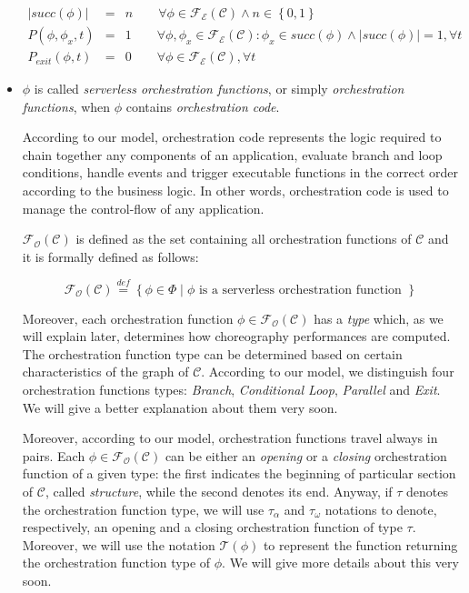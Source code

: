 \documentclass[12pt,a4paper]{report}
\newcommand{\mathDef}{\overset{\textit{def}}{=}}
\begin{document}
\begin{itemize}
	\begin{eqnarray}
		|succ(\phi)| & = & n \qquad \forall \phi \in \mathscr{F_E}(\mathcal{C}) \label{eq:executableFP1} \wedge n \in \left\{0,1\right\} \\
		P(\phi, \phi_x,t) & = & 1 \qquad \forall \phi, \phi_x \in \mathscr{F_E}(\mathcal{C}) : \phi_x \in succ(\phi) \wedge |succ(\phi)| = 1, \forall t \qquad \qquad \label{eq:executableFP2} \\
		P_{exit}(\phi, t) & = & 0 \qquad \forall \phi \in \mathscr{F_E}(\mathcal{C}), \forall t
	\end{eqnarray}


	\item $\phi$ is called \textit{serverless orchestration functions}, or simply \textit{orchestration functions}, when $\phi$ contains \textit{orchestration code}. 
	
	According to our model, orchestration code represents the logic required to chain together any components of an application, evaluate branch and loop conditions, handle events and trigger executable functions in the correct order according to the business logic. In other words, orchestration code is used to manage the control-flow of any application.
	
	$\mathscr{F_O}(\mathcal{C})$ is defined as the set containing all orchestration functions of $\mathcal{C}$ and it is formally defined as follows:
	
	\begin{equation}
		\mathscr{F_O}(\mathcal{C}) \mathDef \left\lbrace \phi \in \Phi \mid \phi \text{ is a serverless orchestration function }\right\rbrace 
	\end{equation}

	Moreover, each orchestration function $\phi \in \mathscr{F_O}(\mathcal{C})$ has a \textit{type} which, as we will explain later, determines how choreography performances are computed. The orchestration function type can be determined based on certain characteristics of the graph of $\mathcal{C}$. According to our model, we distinguish four orchestration functions types: \textit{Branch}, \textit{Conditional Loop}, \textit{Parallel} and \textit{Exit}. We will give a better explanation about them very soon.

	Moreover, according to our model, orchestration functions travel always in pairs. Each $\phi \in \mathscr{F_O}(\mathcal{C})$ can be either an \textit{opening} or a \textit{closing} orchestration function of a given type: the first indicates the beginning of particular section of $\mathcal{C}$, called \textit{structure}, while the second denotes its  end. Anyway, if $\tau$ denotes the orchestration function type, we will use $\tau_{\alpha}$ and $\tau_{\omega}$ notations to denote, respectively, an opening and a closing orchestration function of type $\tau$. Moreover, we will use the notation $\mathscr{T}(\phi)$ to represent the function returning the orchestration function type of $\phi$. We will give more details about this very soon.
	

\end{itemize}
\end{document}
